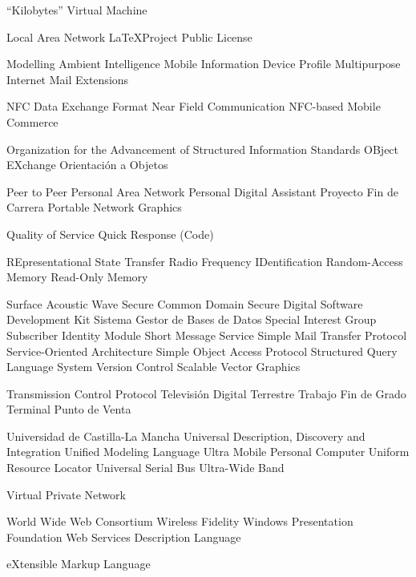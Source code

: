{\begin{acronym}[XXXXXXXX]
       {``Kilobytes'' Virtual Machine}

       {Local Area Network}
      {\LaTeX Project Public License}

      {Modelling Ambient Intelligence}
      {Mobile Information Device Profile}
      {Multipurpose Internet Mail Extensions}

      {NFC Data Exchange Format}
       {Near Field Communication}
       {NFC-based Mobile Commerce}

     {Organization for the Advancement of Structured Information Standards}
      {OBject EXchange}
        {Orientación a Objetos}

       {Peer to Peer}
       {Personal Area Network}
       {Personal Digital Assistant}
       {Proyecto Fin de Carrera}
       {Portable Network Graphics}

       {Quality of Service}
        {Quick Response (Code)}

      {REpresentational State Transfer}
      {Radio Frequency IDentification}
       {Random-Access Memory}
       {Read-Only Memory}

       {Surface Acoustic Wave}
       {Secure Common Domain}
        {Secure Digital}
       {Software Development Kit}
      {Sistema Gestor de Bases de Datos}
       {Special Interest Group}
       {Subscriber Identity Module}
       {Short Message Service}
      {Simple Mail Transfer Protocol}
       {Service-Oriented Architecture}
      {Simple Object Access Protocol}
       {Structured Query Language}
       {System Version Control}
       {Scalable Vector Graphics}

       {Transmission Control Protocol}
       {Televisión Digital Terrestre}
       {Trabajo Fin de Grado}
       {Terminal Punto de Venta}

      {Universidad de Castilla-La Mancha}
      {Universal Description, Discovery and Integration}
       {Unified Modeling Language}
      {Ultra Mobile Personal Computer}
       {Uniform Resource Locator}
       {Universal Serial Bus}
       {Ultra-Wide Band}

       {Virtual Private Network}

       {World Wide Web Consortium}
      {Wireless Fidelity}
       {Windows Presentation Foundation}
      {Web Services Description Language}

       {eXtensible Markup Language}
\end{acronym}
}


